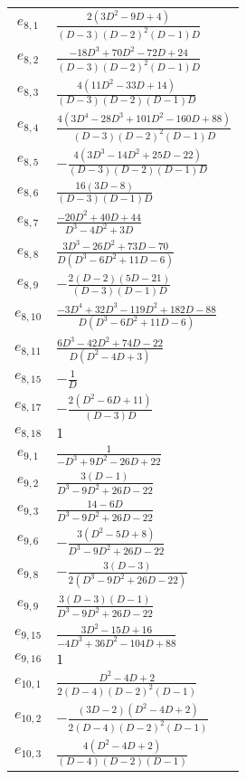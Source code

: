 \documentclass[a4paper,11pt]{article}
\begin{document}
\begin{longtable}{|c|l|}
    \hline
    $e_{8, 1}$ & $\frac{2 \left(3 D^2-9 D+4\right)}{(D-3) (D-2)^2 (D-1) D}$ \\
    $e_{8, 2}$ & $\frac{-18 D^3+70 D^2-72 D+24}{(D-3) (D-2)^2 (D-1) D}$ \\
    $e_{8, 3}$ & $\frac{4 \left(11 D^2-33 D+14\right)}{(D-3) (D-2) (D-1) D}$ \\
    $e_{8, 4}$ & $\frac{4 \left(3 D^4-28 D^3+101 D^2-160 D+88\right)}{(D-3) (D-2)^2 (D-1) D}$ \\
    $e_{8, 5}$ & $-\frac{4 \left(3 D^3-14 D^2+25 D-22\right)}{(D-3) (D-2) (D-1) D}$ \\
    $e_{8, 6}$ & $\frac{16 (3 D-8)}{(D-3) (D-1) D}$ \\
    $e_{8, 7}$ & $\frac{-20 D^2+40 D+44}{D^3-4 D^2+3 D}$ \\
    $e_{8, 8}$ & $\frac{3 D^3-26 D^2+73 D-70}{D \left(D^3-6 D^2+11 D-6\right)}$ \\
    $e_{8, 9}$ & $-\frac{2 (D-2) (5 D-21)}{(D-3) (D-1) D}$ \\
    $e_{8, 10}$ & $\frac{-3 D^4+32 D^3-119 D^2+182 D-88}{D \left(D^3-6 D^2+11 D-6\right)}$ \\
    $e_{8, 11}$ & $\frac{6 D^3-42 D^2+74 D-22}{D \left(D^2-4 D+3\right)}$ \\
    $e_{8, 15}$ & $-\frac{1}{D}$ \\
    $e_{8, 17}$ & $-\frac{2 \left(D^2-6 D+11\right)}{(D-3) D}$ \\
    $e_{8, 18}$ & $1$ \\
    \hline
    $e_{9, 1}$ & $\frac{1}{-D^3+9 D^2-26 D+22}$ \\
    $e_{9, 2}$ & $\frac{3 (D-1)}{D^3-9 D^2+26 D-22}$ \\
    $e_{9, 3}$ & $\frac{14-6 D}{D^3-9 D^2+26 D-22}$ \\
    $e_{9, 6}$ & $-\frac{3 \left(D^2-5 D+8\right)}{D^3-9 D^2+26 D-22}$ \\
    $e_{9, 8}$ & $-\frac{3 (D-3)}{2 \left(D^3-9 D^2+26 D-22\right)}$ \\
    $e_{9, 9}$ & $\frac{3 (D-3) (D-1)}{D^3-9 D^2+26 D-22}$ \\
    $e_{9, 15}$ & $\frac{3 D^2-15 D+16}{-4 D^3+36 D^2-104 D+88}$ \\
    $e_{9, 16}$ & $1$ \\
    \hline
    $e_{10, 1}$ & $\frac{D^2-4 D+2}{2 (D-4) (D-2)^2 (D-1)}$ \\
    $e_{10, 2}$ & $-\frac{(3 D-2) \left(D^2-4 D+2\right)}{2 (D-4) (D-2)^2 (D-1)}$ \\
    $e_{10, 3}$ & $\frac{4 \left(D^2-4 D+2\right)}{(D-4) (D-2) (D-1)}$ \\

\end{longtable}
\end{document}
